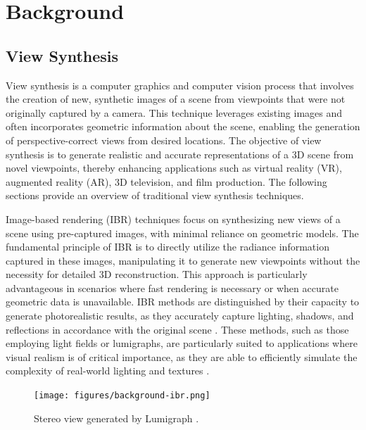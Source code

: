%
\chapter{Background}
\label{sec:background}

\section{View Synthesis}

View synthesis is a computer graphics and computer vision process that involves the creation of new, synthetic images of a scene from viewpoints that were not originally captured by a camera. This technique leverages existing images and often incorporates geometric information about the scene, enabling the generation of perspective-correct views from desired locations.
The objective of view synthesis is to generate realistic and accurate representations of a 3D scene from novel viewpoints, thereby enhancing applications such as virtual reality (VR), augmented reality (AR), 3D television, and film production. The following sections provide an overview of traditional view synthesis techniques.

Image-based rendering (IBR) techniques focus on synthesizing new views of a scene using pre-captured images, with minimal reliance on geometric models.
The fundamental principle of IBR is to directly utilize the radiance information captured in these images, manipulating it to generate new viewpoints without the necessity for detailed 3D reconstruction.
This approach is particularly advantageous in scenarios where fast rendering is necessary or when accurate geometric data is unavailable.
IBR methods are distinguished by their capacity to generate photorealistic results, as they accurately capture lighting, shadows, and reflections in accordance with the original scene .
These methods, such as those employing light fields or lumigraphs, are particularly suited to applications where visual realism is of critical importance, as they are able to efficiently simulate the complexity of real-world lighting and textures \cite{buehler_unstructured_2001,chen_view_1993,debevec_modeling_1996,gortler_lumigraph_1996,levoy_light_1996}.

\begin{figure}[h!]
  \centering
	\texttt{[image: figures/background-ibr.png]}
	\caption{Stereo view generated by Lumigraph \cite{gortler_lumigraph_1996}.}
  \label{fig:background-ibr}
\end{figure}


